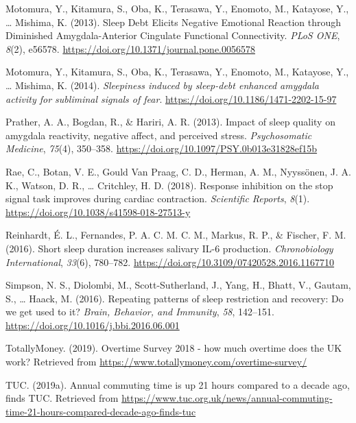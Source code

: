 \documentclass[
  english,
  man]{apa6}
\newlength{\cslhangindent}
\newenvironment{cslreferences}%
  {\setlength{\parindent}{0pt}%
  \everypar{\setlength{\hangindent}{\cslhangindent}}\ignorespaces}%
  {\par}
\begin{document}
\begin{cslreferences}
\leavevmode\hypertarget{ref-Motomura2013}{}%
Motomura, Y., Kitamura, S., Oba, K., Terasawa, Y., Enomoto, M., Katayose, Y., \ldots{} Mishima, K. (2013). Sleep Debt Elicits Negative Emotional Reaction through Diminished Amygdala-Anterior Cingulate Functional Connectivity. \emph{PLoS ONE}, \emph{8}(2), e56578. \url{https://doi.org/10.1371/journal.pone.0056578}

\leavevmode\hypertarget{ref-Motomura2014}{}%
Motomura, Y., Kitamura, S., Oba, K., Terasawa, Y., Enomoto, M., Katayose, Y., \ldots{} Mishima, K. (2014). \emph{Sleepiness induced by sleep-debt enhanced amygdala activity for subliminal signals of fear}. \url{https://doi.org/10.1186/1471-2202-15-97}

\leavevmode\hypertarget{ref-Prather2013}{}%
Prather, A. A., Bogdan, R., \& Hariri, A. R. (2013). Impact of sleep quality on amygdala reactivity, negative affect, and perceived stress. \emph{Psychosomatic Medicine}, \emph{75}(4), 350--358. \url{https://doi.org/10.1097/PSY.0b013e31828ef15b}

\leavevmode\hypertarget{ref-Rae2018}{}%
Rae, C., Botan, V. E., Gould Van Praag, C. D., Herman, A. M., Nyyssönen, J. A. K., Watson, D. R., \ldots{} Critchley, H. D. (2018). Response inhibition on the stop signal task improves during cardiac contraction. \emph{Scientific Reports}, \emph{8}(1). \url{https://doi.org/10.1038/s41598-018-27513-y}

\leavevmode\hypertarget{ref-Reinhardt2016}{}%
Reinhardt, É. L., Fernandes, P. A. C. M. C. M., Markus, R. P., \& Fischer, F. M. (2016). Short sleep duration increases salivary IL-6 production. \emph{Chronobiology International}, \emph{33}(6), 780--782. \url{https://doi.org/10.3109/07420528.2016.1167710}

\leavevmode\hypertarget{ref-Simpson2016}{}%
Simpson, N. S., Diolombi, M., Scott-Sutherland, J., Yang, H., Bhatt, V., Gautam, S., \ldots{} Haack, M. (2016). Repeating patterns of sleep restriction and recovery: Do we get used to it? \emph{Brain, Behavior, and Immunity}, \emph{58}, 142--151. \url{https://doi.org/10.1016/j.bbi.2016.06.001}

\leavevmode\hypertarget{ref-TotallyMoney}{}%
TotallyMoney. (2019). Overtime Survey 2018 - how much overtime does the UK work? Retrieved from \url{https://www.totallymoney.com/overtime-survey/}

\leavevmode\hypertarget{ref-TUC2}{}%
TUC. (2019a). Annual commuting time is up 21 hours compared to a decade ago, finds TUC. Retrieved from \url{https://www.tuc.org.uk/news/annual-commuting-time-21-hours-compared-decade-ago-finds-tuc}


\end{cslreferences}
\end{document}
